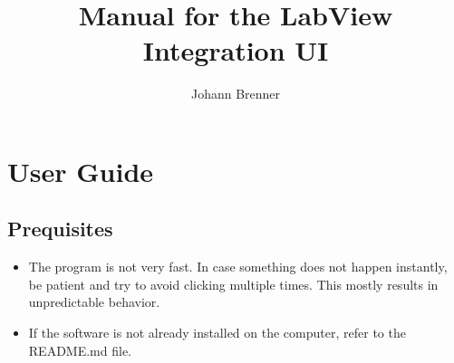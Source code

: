 \documentclass{article}
\title{Manual for the LabView Integration UI}
\author{Johann Brenner}
\begin{document}
	\maketitle
	\tableofcontents 



\section{User Guide}

\subsection{Prequisites}
\begin{itemize}
	\item	The program is not very fast. In case something does not happen instantly, be patient and try to avoid clicking multiple times. This mostly results in unpredictable behavior.
	\item	If the software is not already installed on the computer, refer to the README.md file.
	
\end{itemize}
\end{document}
